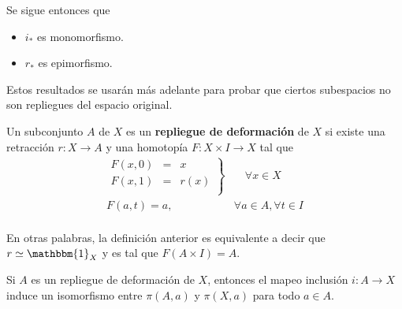 \documentclass[12pt]{report}
\theoremstyle{largebreak}
\newcommand\cf[3]{\ensuremath{#1:#2\rightarrow#3}}
\newcommand{\bbm}[1]{\ensuremath{\mathbbm{#1}}}
\begin{document}
    Se sigue entonces que
    \begin{itemize}
        \item $i_*$ es monomorfismo.
        \item $r_*$ es epimorfismo.
    \end{itemize}

    Estos resultados se usarán más adelante para probar que ciertos subespacios no son repliegues del espacio original.

    \begin{mydef}
        Un subconjunto $A$ de $X$ es un \textbf{repliegue de deformación} de $X$ si existe una retracción $\cf{r}{X}{A}$ y una homotopía $\cf{F}{X\times I}{X}$ tal que
        \begin{equation*}
            \begin{split}
                \left.
                \begin{array}{rcl}
                    F(x,0) & = & x\\
                    F(x,1) & = & r(x)\\
                \end{array}
            \right\} & \quad\forall x\in X\\
            F(a,t)=a,\quad&\forall a\in A, \forall t\in I\\
            \end{split}
        \end{equation*}
    \end{mydef}

    En otras palabras, la definición anterior es equivalente a decir que $r\simeq \bbm{1}_X$ y es tal que $F(A\times I)=A$.
    
    \begin{theor}
        Si $A$ es un repliegue de deformación de $X$, entonces el mapeo inclusión $\cf{i}{A}{X}$ induce un isomorfismo entre $\pi(A,a)$ y $\pi(X,a)$ para todo $a\in A$.
    \end{theor}
\end{document}
